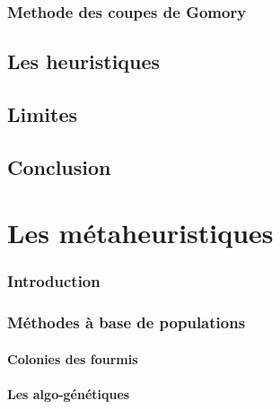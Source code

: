 \documentclass[a4paper,11pt,oneside]{report}
\theoremstyle{plain}
\newcommand{\0}{/ \! \! \! 0}
\theoremstyle{plain}
\begin{document}
\subsection{Methode des coupes de Gomory}



\section{Les heuristiques}




\section{Limites}



\section{Conclusion}


\chapter{Les m\'etaheuristiques}


\subsection{Introduction}
 
\subsection{M\'ethodes \`a base de populations}

\subsubsection{Colonies des fourmis}

\subsubsection{Les algo-g\'en\'etiques}
\end{document}

